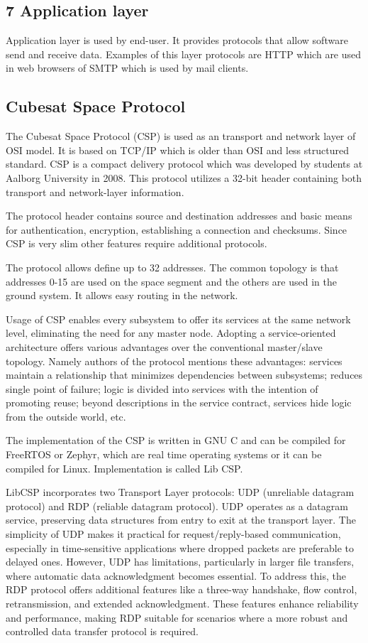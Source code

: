 \documentclass[conference]{IEEEtran}
\begin{document}
\subsection{7 Application layer}
Application layer is used by end-user. It provides protocols that allow software send and receive data. Examples of this layer protocols are HTTP which are used in web browsers of SMTP which is used by mail clients.

\subsection{Cubesat Space Protocol}
The Cubesat Space Protocol (CSP) is used as an transport and network layer of OSI model. It is based on TCP/IP which is older than OSI and less structured standard. CSP is a compact delivery protocol which was developed by students at Aalborg University in 2008. This protocol utilizes a 32-bit header containing both transport and network-layer information.\cite{Mineo-Wakita}

The protocol header contains source and destination addresses and basic means for authentication, encryption, establishing a connection and checksums. Since CSP is very slim other features require additional protocols.\cite{grillmayer}

The protocol allows define up to 32 addresses. The common topology is that addresses 0-15 are used on the space segment and the others are used in the ground system. It allows easy routing in the network.\cite{GomSpace}

Usage of CSP enables every subsystem to offer its services at the same network level, eliminating the need for any master node. Adopting a service-oriented architecture offers various advantages over the conventional master/slave topology. Namely authors of the protocol mentions these advantages: services maintain a relationship that minimizes dependencies between subsystems; reduces single point of failure; logic is divided into services with the intention of promoting reuse; beyond descriptions in the service contract, services hide logic from the outside world, etc. 

The implementation of the CSP is written in GNU C and can be compiled for FreeRTOS or Zephyr, which are real time operating systems or it can be compiled for Linux. Implementation is called Lib CSP.\cite{libcsp}

LibCSP incorporates two Transport Layer protocols: UDP (unreliable datagram protocol) and RDP (reliable datagram protocol). UDP operates as a datagram service, preserving data structures from entry to exit at the transport layer. The simplicity of UDP makes it practical for request/reply-based communication, especially in time-sensitive applications where dropped packets are preferable to delayed ones. However, UDP has limitations, particularly in larger file transfers, where automatic data acknowledgment becomes essential. To address this, the RDP protocol offers additional features like a three-way handshake, flow control, retransmission, and extended acknowledgment. These features enhance reliability and performance, making RDP suitable for scenarios where a more robust and controlled data transfer protocol is required.
\end{document}
